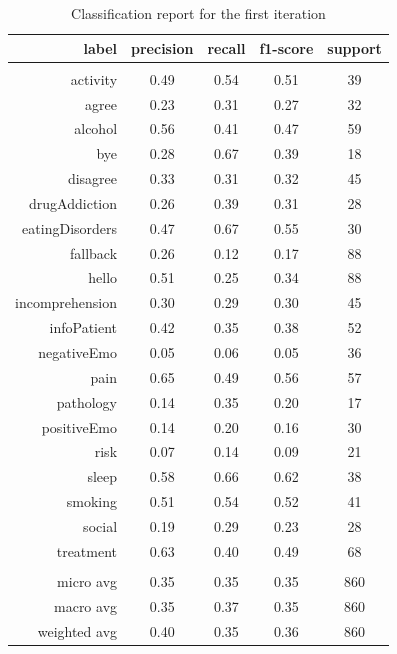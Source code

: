 \documentclass[11pt]{article}
\begin{document}
\begin{table}[htb]
\begin{center}
\begin{tabular}{ |r|c|c|c|c| }
\hline
label 			& precision & recall & f1-score &  support\\ \hline 
\\ \hline 
activity 		&  0.49 & 0.54 & 0.51 &   39\\ \hline 
agree 			&  0.23 & 0.31 & 0.27 &   32\\ \hline 
alcohol 		&  0.56 & 0.41 & 0.47 &   59\\ \hline 
bye 			&  0.28 & 0.67 & 0.39 &   18\\ \hline 
disagree 		&  0.33 & 0.31 & 0.32 &   45\\ \hline 
drugAddiction 	&  0.26 & 0.39 & 0.31 &   28\\ \hline 
eatingDisorders &  0.47 & 0.67 & 0.55 &   30\\ \hline 
fallback 		&  0.26 & 0.12 & 0.17 &   88\\ \hline 
hello 			&  0.51 & 0.25 & 0.34 &   88\\ \hline 
incomprehension &  0.30 & 0.29 & 0.30 &   45\\ \hline 
infoPatient 	&  0.42 & 0.35 & 0.38 &   52\\ \hline 
negativeEmo 	&  0.05 & 0.06 & 0.05 &   36\\ \hline 
pain 			&  0.65 & 0.49 & 0.56 &   57\\ \hline 
pathology 		&  0.14 & 0.35 & 0.20 &   17\\ \hline 
positiveEmo 	&  0.14 & 0.20 & 0.16 &   30\\ \hline 
risk 			&  0.07 & 0.14 & 0.09 &   21\\ \hline 
sleep 			&  0.58 & 0.66 & 0.62 &   38\\ \hline 
smoking 		&  0.51 & 0.54 & 0.52 &   41\\ \hline 
social 			&  0.19 & 0.29 & 0.23 &   28\\ \hline 
treatment 		&  0.63 & 0.40 & 0.49 &   68\\ \hline 
\\ \hline 
micro avg 		&  0.35 & 0.35 & 0.35 &  860\\ \hline 
macro avg 		&  0.35 & 0.37 & 0.35 &  860\\ \hline 
weighted avg 	&  0.40 & 0.35 & 0.36 &  860\\ \hline 
\end{tabular}
\caption{Classification report for the first iteration}
\end{center}
\end{table}
\FloatBarrier
\end{document}
